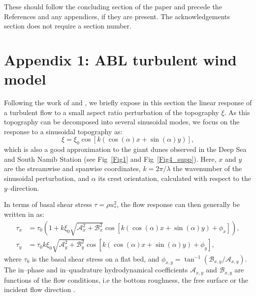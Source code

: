\begin{acknowledgements}
These should follow the concluding section of the paper and precede the References and any appendices, if they are present. The acknowledgements section does not require a section number.
\end{acknowledgements}

\section*{Appendix 1: ABL turbulent wind model}

Following the work of \citet{Fourriere2010} and \citet{Andreotti2012}, we briefly expose in this section the linear response of a turbulent flow to a small aspect ratio perturbation of the topography $\xi$. As this topography can be decomposed into several sinusoidal modes, we focus on the response to a sinusoidal topography as:
\begin{equation}
  \xi = \xi_{0}\cos\left[k\left(\cos(\alpha)x + \sin(\alpha)y\right)\right],
\end{equation}
which is also a good approximation to the giant dunes observed in the Deep Sea and South Namib Station (see Fig~\ref{Fig1} and Fig~\ref{Fig4_supp}). Here, $x$ and $y$ are the streamwise and spanwise coordinates, $k=2\pi/\lambda$ the wavenumber of the sinusoidal perturbation, and $\alpha$ its crest orientation, calculated with respect to the $y$--direction.

In terms of basal shear stress $\tau = \rho u_{*}^{2}$, the flow response can then generally be written in as:
\begin{align}
  \tau_{x} & = \tau_{0}\left(1 + k\xi_{0}\sqrt{\mathcal{A}_{x}^{2} + \mathcal{B}_{x}^{2}}\cos\left[k\left(\cos(\alpha)x + \sin(\alpha)y\right) + \phi_{x}\right]\right), \\
  \tau_{y} & = \tau_{0}k\xi_{0}\sqrt{\mathcal{A}_{y}^{2} + \mathcal{B}_{y}^{2}}\cos\left[k\left(\cos(\alpha)x + \sin(\alpha)y\right) + \phi_{y}\right],
\end{align}
where $\tau_{0}$ is the basal shear stress on a flat bed, and $\phi_{x, y} = \tan^{-1}\left(\mathcal{B}_{x, y}/\mathcal{A}_{x, y}\right)$. The in--phase and in--quadrature hydrodynamical coefficients $\mathcal{A}_{x, y}$ and $\mathcal{B}_{x, y}$ are functions of the flow conditions, i.e the bottom roughness, the free surface or the incident flow direction \citep{Fourriere2010, andreotti2009, Andreotti2012, Charru2013}.

